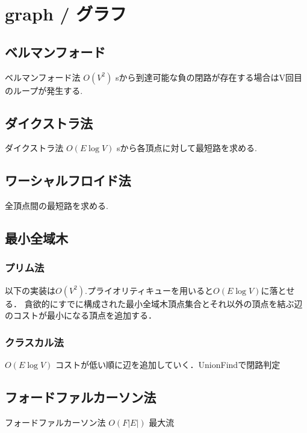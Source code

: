 \section{graph / グラフ}
\subsection{ベルマンフォード}
ベルマンフォード法
$O(V^2)$
sから到達可能な負の閉路が存在する場合はV回目のループが発生する.


\subsection{ダイクストラ法}
ダイクストラ法
$O(E \log V)$
sから各頂点に対して最短路を求める.


 \subsection{ワーシャルフロイド法}
全頂点間の最短路を求める.


\subsection{最小全域木}
\subsubsection{プリム法}
以下の実装は$O(V^2)$.プライオリティキューを用いると$O(E \log V)$に落とせる．
貪欲的にすでに構成された最小全域木頂点集合とそれ以外の頂点を結ぶ辺のコストが最小になる頂点を追加する．


\subsubsection{クラスカル法}
$O(E \log V)$
コストが低い順に辺を追加していく．UnionFindで閉路判定


\subsection{フォードファルカーソン法}
フォードファルカーソン法
$O(F|E|)$
最大流


